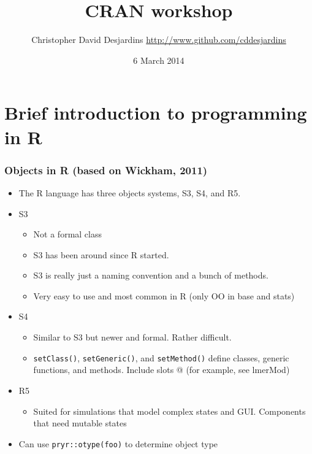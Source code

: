 \documentclass[xcolor=svgnames]{beamer}\usepackage[]{graphicx}\usepackage[]{color}
\title{CRAN workshop}
\author{Christopher David Desjardins
\url{http://www.github.com/cddesjardins}}
\date{6 March 2014}
\begin{document}
\frame{\titlepage}
  

\section{Brief introduction to programming in R}


\begin{frame}
  \frametitle{Objects in R (based on Wickham, 2011)}
  \begin{itemize}
  \item The R language has three objects systems, S3, S4, and R5.
  \item S3
    \begin{itemize}
      \item Not a formal class
      \item S3 has been around since R started.
      \item S3 is really just a naming convention and a bunch of methods.
        \item Very easy to use and most common in R (only OO in base and stats)
   \end{itemize}
  \item S4
    \begin{itemize}
      \item Similar to S3 but newer and formal. Rather difficult.
        \item \texttt{setClass()}, \texttt{setGeneric()}, and \texttt{setMethod()} define classes, generic functions, and methods. Include slots @ (for example, see lmerMod)
    \end{itemize}
    \item R5
      \begin{itemize}
        \item Suited for simulations that model complex states and GUI. Components that need mutable states
      \end{itemize}
      \item Can use \texttt{pryr::otype(foo)} to determine object type
  \end{itemize}
\end{frame}
\end{document}
